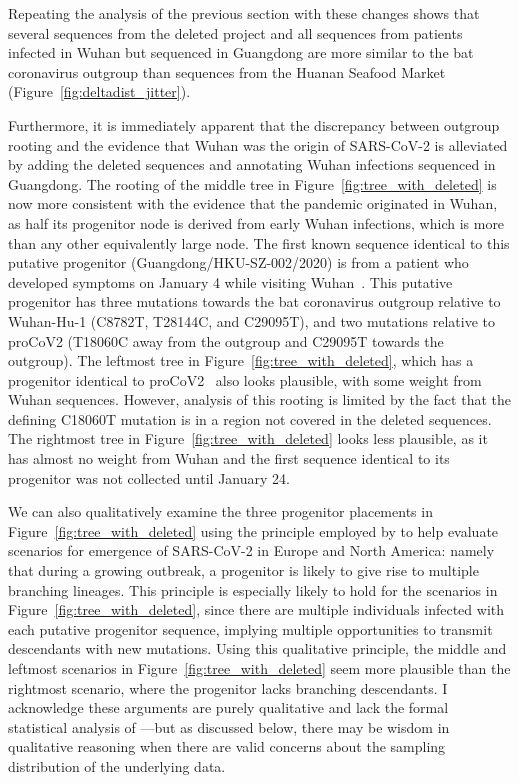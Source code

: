 \documentclass[9pt,twocolumn,twoside]{gsajnl_modified}
\begin{document}
Repeating the analysis of the previous section with these changes shows that several sequences from the deleted project and all sequences from patients infected in Wuhan but sequenced in Guangdong are more similar to the bat coronavirus outgroup than sequences from the Huanan Seafood Market (Figure~\ref{fig:deltadist_jitter}).

Furthermore, it is immediately apparent that the discrepancy between outgroup rooting and the evidence that Wuhan was the origin of SARS-CoV-2 is alleviated by adding the deleted sequences and annotating Wuhan infections sequenced in Guangdong.
The rooting of the middle tree in Figure~\ref{fig:tree_with_deleted} is now more consistent with the evidence that the pandemic originated in Wuhan, as half its progenitor node is derived from early Wuhan infections, which is more than any other equivalently large node.
The first known sequence identical to this putative progenitor (Guangdong/HKU-SZ-002/2020) is from a patient who developed symptoms on January 4 while visiting Wuhan~\citep{chan2020familial}.
This putative progenitor has three mutations towards the bat coronavirus outgroup relative to Wuhan-Hu-1 (C8782T, T28144C, and C29095T), and two mutations relative to proCoV2 (T18060C away from the outgroup and C29095T towards the outgroup).
The leftmost tree in Figure~\ref{fig:tree_with_deleted}, which has a progenitor identical to proCoV2~\citep{kumar2021evolutionary} also looks plausible, with some weight from Wuhan sequences.
However, analysis of this rooting is limited by the fact that the defining C18060T mutation is in a region not covered in the deleted sequences.
The rightmost tree in Figure~\ref{fig:tree_with_deleted} looks less plausible, as it has almost no weight from Wuhan and the first sequence identical to its progenitor was not collected until January 24.

We can also qualitatively examine the three progenitor placements in Figure~\ref{fig:tree_with_deleted} using the principle employed by \citet{worobey2020emergence} to help evaluate scenarios for emergence of SARS-CoV-2 in Europe and North America: namely that during a growing outbreak, a progenitor is likely to give rise to multiple branching lineages.
This principle is especially likely to hold for the scenarios in Figure~\ref{fig:tree_with_deleted}, since there are multiple individuals infected with each putative progenitor sequence, implying multiple opportunities to transmit descendants with new mutations.
Using this qualitative principle, the middle and leftmost scenarios in Figure~\ref{fig:tree_with_deleted} seem more plausible than the rightmost scenario, where the progenitor lacks branching descendants.
I acknowledge these arguments are purely qualitative and lack the formal statistical analysis of \citet{worobey2020emergence}---but as discussed below, there may be wisdom in qualitative reasoning when there are valid concerns about the sampling distribution of the underlying data.
\end{document}

